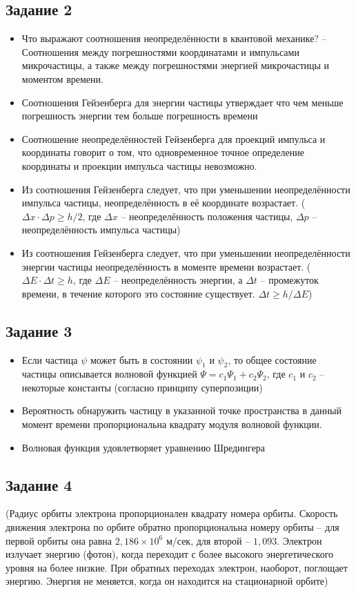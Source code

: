 \documentclass[../main.tex]{subfiles}
\begin{document}
\subsection{Задание 2}
\begin{itemize}
    \item Что выражают соотношения неопределённости в квантовой механике? -- Соотношения между погрешностями координатами и импульсами микрочастицы, а также между погрешностями энергией микрочастицы и моментом времени.
    \item Соотношения Гейзенберга для энергии частицы утверждает что чем меньше погрешность энергии тем больше погрешность времени
    \item Соотношение неопределённостей Гейзенберга для проекций импульса и координаты говорит о том, что одновременное точное определение координаты и проекции импульса частицы невозможно.
    \item Из соотношения Гейзенберга следует, что при уменьшении неопределённости импульса частицы, неопределённость в её координате возрастает. ($\Delta x \cdot \Delta p \ge h/2$, где $\Delta x$ -- неопределённость положения частицы, $\Delta p$ -- неопределённость импульса частицы)
    \item Из соотношения Гейзенберга следует, что при уменьшении неопределённости энергии частицы неопределённость в моменте времени возрастает. ($\Delta E \cdot \Delta t \ge h$, где $\Delta E$ -- неопределённость энергии, а $\Delta t$ -- промежуток времени, в течение которого это состояние существует. $\Delta t \ge h/\Delta E$)
\end{itemize}

\subsection{Задание 3}
\begin{itemize}
    \item Если частица $\psi$ может быть в состоянии $\psi_1$ и $\psi_2$, то общее состояние частицы описывается волновой функцией $\Psi = c_1 \Psi_1 + c_2 \Psi_2$, где $c_1$ и $c_2$ -- некоторые константы (согласно принципу суперпозиции)
    \item Вероятность обнаружить частицу в указанной точке пространства в данный момент времени пропорциональна квадрату модуля волновой функции.
    \item Волновая функция удовлетворяет уравнению Шредингера
\end{itemize}

\subsection{Задание 4}
(Радиус орбиты электрона пропорционален квадрату номера орбиты. Скорость движения электрона по орбите обратно пропорциональна номеру орбиты -- для первой орбиты она равна $2,186 \times 10^6$ м/сек, для второй -- $1,093$.
Электрон излучает энергию (фотон), когда переходит с более высокого энергетического уровня на более низкие. При обратных переходах электрон, наоборот, поглощает энергию. Энергия не меняется, когда он находится на стационарной орбите)
\end{document}
